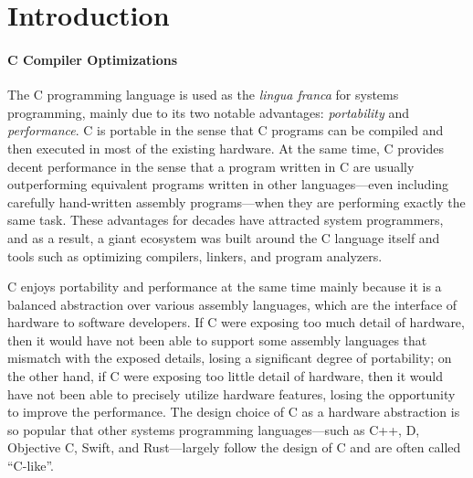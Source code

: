 \section{Introduction}
\label{sec:introduction}


\paragraph{C Compiler Optimizations}

The C programming language is used as the \emph{lingua franca} for systems programming, mainly due
to its two notable advantages: \emph{portability} and \emph{performance}.  C is portable in the
sense that C programs can be compiled and then executed in most of the existing hardware.  At the
same time, C provides decent performance in the sense that a program written in C are usually
outperforming equivalent programs written in other languages---even including carefully hand-written
assembly programs---when they are performing exactly the same task.  These advantages for decades
have attracted system programmers, and as a result, a giant ecosystem was built around the C
language itself and tools such as optimizing compilers, linkers, and program analyzers.


C enjoys portability and performance at the same time mainly because it is a balanced abstraction
over various assembly languages, which are the interface of hardware to software developers.  If C
were exposing too much detail of hardware, then it would have not been able to support some assembly
languages that mismatch with the exposed details, losing a significant degree of portability; on the
other hand, if C were exposing too little detail of hardware, then it would have not been able to
precisely utilize hardware features, losing the opportunity to improve the performance.  The design
choice of C as a hardware abstraction is so popular that other systems programming languages---such
as C++, D, Objective C, Swift, and Rust---largely follow the design of C and are often called
``C-like''.



